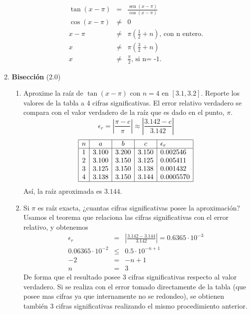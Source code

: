 \documentclass[12pt]{article}
\renewcommand{\sin}{\operatorname{sen}}
\DeclareMathOperator{\sen}{sen}
\renewcommand{\sin}{\sen}
\begin{document}
\begin{enumerate}[leftmargin=*,widest=9]
\begin{enumerate}[label=\alph*]
\begin{eqnarray*}
   \tan(x- \pi) & = & \frac{\sin(x-\pi)}{\cos(x-\pi)} \\
   \cos(x - \pi) & \neq & 0 \\
   x - \pi & \neq & \pi \left( \frac{1}{2} + n \right) \text{, con n entero.} \\
   x & \neq & \pi \left(\frac{3}{2} + n \right) \\
   x & \neq & \frac{\pi}{2} \text{, si n= -1.}
   \end{eqnarray*}
    \end{enumerate}
    \item \textbf{Bisección} ($2.0$)
    \begin{enumerate}[label=\alph*]
    \item Aproxime la raíz de $\tan (x - \pi)$ con $n=4$ en $\left[3.1, 3.2\right]$. Reporte los valores de la tabla a 4 cifras significativas.
    El error relativo verdadero se compara con el valor verdadero de la raíz que es dado en el punto, $\pi$.
    \[ \epsilon_r = \left| \frac{\pi - c}{\pi} \right| \approx \left|\frac{3.142 - c}{3.142} \right| \]
    \[
    \begin{array}{|c|c|c|c|l|}
    \hline
    n & a & b & c & \epsilon_r \\
    \hline
    1 &  3.100  & 3.200 & 3.150 & 0.002546 \\
 2 &  3.100 & 3.150 & 3.125 & 0.005411 \\
 3 & 3.125 & 3.150 & 3.138 & 0.001432 \\
 4 & 3.138 & 3.150 & 3.144 & 0.0005570 \\
    \hline
    \end{array}
    \]
    Así, la raíz aproximada es $3.144$.
    \item Si $\pi$ es raíz exacta, ¿cuantas cifras significativas posee la aproximación?
    Usamos el teorema que relaciona las cifras significativas con el error relativo, y obtenemos
    \begin{eqnarray*}
    \epsilon_r  & = & \left| \frac{3.142 - 3.144}{3.142} \right| = 0.6365\cdot 10^{-3}  \\
    0.06365\cdot 10^{-2} & \leq & 0.5 \cdot 10^{-n + 1} \\
    -2 & = & -n + 1 \\
    n & = & 3
    \end{eqnarray*}
    De forma que el resultado posee 3 cifras significativas respecto al valor verdadero. Si se realiza con el error tomado directamente de la tabla (que posee mas cifras ya que internamente no se redondeo), se obtienen también 3 cifras significativas realizando el mismo procedimiento anterior.
    \end{enumerate}
  \end{enumerate}
\end{document}
